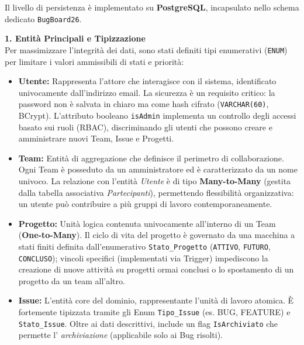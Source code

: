\documentclass[a4paper,12pt]{article}
\begin{document}
\begin{tcolorbox}[
    enhanced,
    colback=white,
    colframe=UninaBlue,
    boxrule=0.8pt,
    arc=3pt,
    sharp corners,
    title=Descrizione del Modello UML,
    fonttitle=\bfseries,
    coltitle=white,
    breakable
]
Il livello di persistenza è implementato su \textbf{PostgreSQL}, incapsulato nello schema dedicato \texttt{BugBoard26}.

\vspace{0.2cm}
\textbf{1. Entità Principali e Tipizzazione} \\
Per massimizzare l'integrità dei dati, sono stati definiti tipi enumerativi (\texttt{ENUM}) per limitare i valori ammissibili di stati e priorità:
\begin{itemize}
    \item \textbf{Utente:} Rappresenta l'attore che interagisce con il sistema, identificato univocamente dall'indirizzo email. La sicurezza è un requisito critico: la password non è salvata in chiaro ma come hash cifrato (\texttt{VARCHAR(60)},  BCrypt). L'attributo booleano \texttt{isAdmin} implementa un controllo degli accessi basato sui ruoli (RBAC), discriminando gli utenti che possono creare e amministrare nuovi Team, Issue e Progetti.
    
    \item \textbf{Team:} Entità di aggregazione che definisce il perimetro di collaborazione. Ogni Team è posseduto da un amministratore ed è caratterizzato da un nome univoco. La relazione con l'entità \textit{Utente} è di tipo \textbf{Many-to-Many} (gestita dalla tabella associativa \textit{Partecipanti}), permettendo flessibilità organizzativa: un utente può contribuire a più gruppi di lavoro contemporaneamente.
    
    \item \textbf{Progetto:} Unità logica contenuta univocamente all'interno di un Team (\textbf{One-to-Many}). Il ciclo di vita del progetto è governato da una macchina a stati finiti definita dall'enumerativo \texttt{Stato\_Progetto} (\texttt{ATTIVO}, \texttt{FUTURO}, \texttt{CONCLUSO}); vincoli specifici (implementati via Trigger) impediscono la creazione di nuove attività su progetti ormai conclusi o lo spostamento di un progetto da un team all'altro.
    
    \item \textbf{Issue:} L'entità core del dominio, rappresentante l'unità di lavoro atomica. È fortemente tipizzata tramite gli Enum \texttt{Tipo\_Issue} (es. BUG, FEATURE) e \texttt{Stato\_Issue}. Oltre ai dati descrittivi, include un flag \texttt{IsArchiviato} che permette l' \textit{archiviazione} (applicabile solo ai Bug risolti).
\end{itemize}


\end{tcolorbox}
\end{document}
